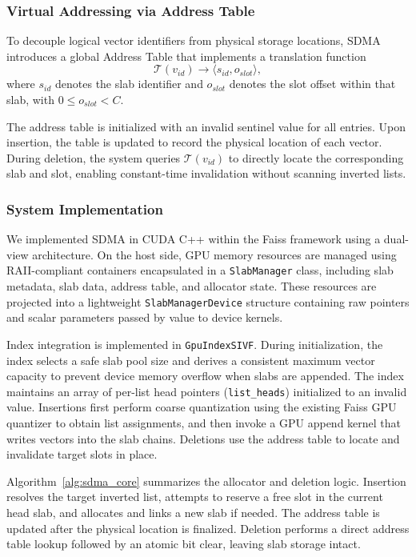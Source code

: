 \documentclass[sigconf,anonymous]{acmart}
\theoremstyle{plain}
\theoremstyle{definition}
\theoremstyle{remark}
\begin{document}
\subsubsection{Virtual Addressing via Address Table}

To decouple logical vector identifiers from physical storage locations, SDMA introduces a global Address Table that implements a translation function
\begin{equation}
    \mathcal{T}(v_{id}) \rightarrow \langle s_{id}, o_{slot} \rangle,
\end{equation}
where $s_{id}$ denotes the slab identifier and $o_{slot}$ denotes the slot offset within that slab, with $0 \le o_{slot} < C$.

The address table is initialized with an invalid sentinel value for all entries. Upon insertion, the table is updated to record the physical location of each vector. During deletion, the system queries $\mathcal{T}(v_{id})$ to directly locate the corresponding slab and slot, enabling constant-time invalidation without scanning inverted lists.

\subsubsection{System Implementation}

We implemented SDMA in CUDA C++ within the Faiss framework using a dual-view architecture. On the host side, GPU memory resources are managed using RAII-compliant containers encapsulated in a \texttt{SlabManager} class, including slab metadata, slab data, address table, and allocator state. These resources are projected into a lightweight \texttt{SlabManagerDevice} structure containing raw pointers and scalar parameters passed by value to device kernels.

Index integration is implemented in \texttt{GpuIndexSIVF}. During initialization, the index selects a safe slab pool size and derives a consistent maximum vector capacity to prevent device memory overflow when slabs are appended. The index maintains an array of per-list head pointers (\texttt{list\_heads}) initialized to an invalid value. Insertions first perform coarse quantization using the existing Faiss GPU quantizer to obtain list assignments, and then invoke a GPU append kernel that writes vectors into the slab chains. Deletions use the address table to locate and invalidate target slots in place.

Algorithm~\ref{alg:sdma_core} summarizes the allocator and deletion logic. Insertion resolves the target inverted list, attempts to reserve a free slot in the current head slab, and allocates and links a new slab if needed. The address table is updated after the physical location is finalized. Deletion performs a direct address table lookup followed by an atomic bit clear, leaving slab storage intact.
\end{document}
